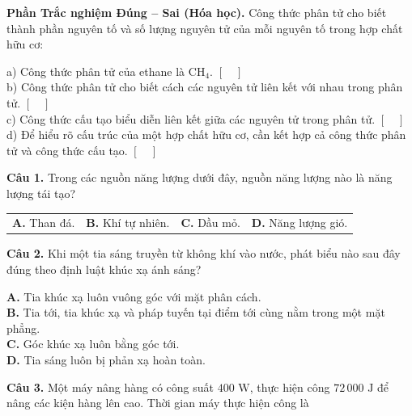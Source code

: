 \documentclass{article}
\begin{document}
\fontsize{24}{32}\selectfont
\textbf{Phần Trắc nghiệm Đúng -- Sai (Hóa học).} Công thức phân tử cho biết thành phần nguyên tố và số lượng nguyên tử của mỗi nguyên tố trong hợp chất hữu cơ:
\vspace{12pt}

a) Công thức phân tử của ethane là $\text{CH}_4$. \hfill $[\quad]$\\[10pt]
b) Công thức phân tử cho biết cách các nguyên tử liên kết với nhau trong phân tử. \hfill $[\quad]$\\[10pt]
c) Công thức cấu tạo biểu diễn liên kết giữa các nguyên tử trong phân tử. \hfill $[\quad]$\\[10pt]
d) Để hiểu rõ cấu trúc của một hợp chất hữu cơ, cần kết hợp cả công thức phân tử và công thức cấu tạo. \hfill $[\quad]$
\vspace*{\fill}
\newpage


\fontsize{25}{33}\selectfont
\textbf{Câu 1.} Trong các nguồn năng lượng dưới đây, nguồn năng lượng nào là năng lượng tái tạo?
\vspace{6pt}

\begin{tabularx}{\linewidth}{@{}X X X X@{}}
\textbf{A.} Than đá. & \textbf{B.} Khí tự nhiên. & \textbf{C.} Dầu mỏ. & \textbf{D.} Năng lượng gió.
\end{tabularx}

\vspace*{\fill}

\textbf{Câu 2.} Khi một tia sáng truyền từ không khí vào nước, phát biểu nào sau đây đúng theo định luật khúc xạ ánh sáng?
\vspace{6pt}

\textbf{A.} Tia khúc xạ luôn vuông góc với mặt phân cách.\\
\textbf{B.} Tia tới, tia khúc xạ và pháp tuyến tại điểm tới cùng nằm trong một mặt phẳng.\\
\textbf{C.} Góc khúc xạ luôn bằng góc tới.\\
\textbf{D.} Tia sáng luôn bị phản xạ hoàn toàn.
\vspace*{\fill}
\newpage

\fontsize{25}{33}\selectfont
\textbf{Câu 3.} Một máy nâng hàng có công suất $400\text{ W}$, thực hiện công $72\,000\text{ J}$ để nâng các kiện hàng lên cao. Thời gian máy thực hiện công là
\vspace{6pt}
\end{document}
